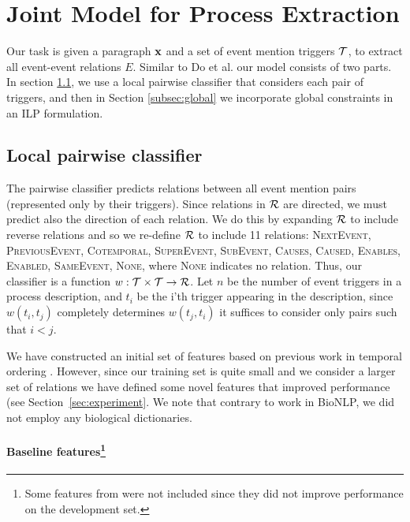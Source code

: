 \section{Joint Model for Process Extraction}

Our task is given a paragraph $\mathbf{x}$ and a set of event mention triggers $\mathcal{T}$, to extract all event-event relations $E$. Similar to Do et al.  our model consists of two parts. In section \ref{subsec:pairwise}, we use a local pairwise classifier that considers each pair of triggers, and then in Section \ref{subsec:global} we incorporate global constraints in an ILP formulation.

\subsection{Local pairwise classifier} \label{subsec:pairwise}

The pairwise classifier predicts relations between all event mention pairs (represented only by their triggers). Since relations in $\mathcal{R}$ are directed, we must predict also the direction of each relation. We do this by expanding $\mathcal{R}$ to include reverse relations and so we re-define $\mathcal{R}$ to include 11 relations: \textsc{NextEvent}, \textsc{PreviousEvent}, \textsc{Cotemporal}, \textsc{SuperEvent}, \textsc{SubEvent}, \textsc{Causes}, \textsc{Caused}, \textsc{Enables}, \textsc{Enabled}, \textsc{SameEvent}, \textsc{None}, where \textsc{None} indicates no relation. Thus, our classifier is a function $w:\mathcal{T} \times \mathcal{T} \rightarrow \mathcal{R}$. Let $n$ be the number of event triggers in a process description, and $t_i$ be the i'th trigger appearing in the description, since $w(t_i,t_j)$ completely determines $w(t_j,t_i)$ it suffices to consider only pairs such that $i<j$.

We have constructed an initial set of features based on previous work in temporal ordering \cite{Chambers08,Do12}. However, since our training set is quite small and we consider a larger set of relations we have defined some novel features that improved performance (see Section~\ref{sec:experiment}. We note that contrary to work in BioNLP, we did not employ any biological dictionaries.

\paragraph{Baseline features\footnote{Some features from \cite{Chambers08,Do12} were not included since they did not improve performance on the development set.}}

